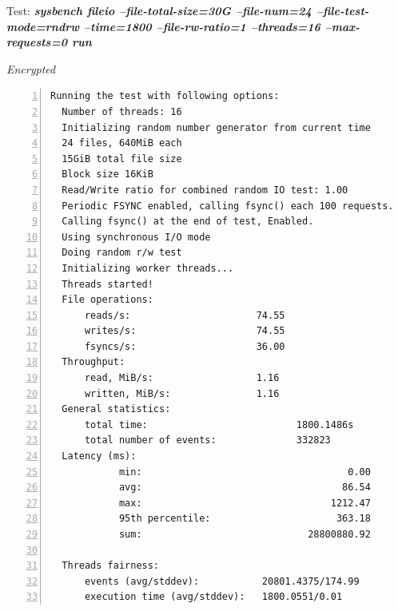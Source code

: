 \newpage
\begin{center}
  Test: \textbf{\textit{sysbench fileio --file-total-size=30G --file-num=24 --file-test-mode=rndrw --time=1800 --file-rw-ratio=1 --threads=16 --max-requests=0 run}}  
\end{center}
\vspace*{-\baselineskip}
\noindent\begin{minipage}[t]{0.45\linewidth}
  \centering
  \textit{Encrypted}
  \lstset{language=bash,label=SliceExaple}
  \begin{lstlisting}[basicstyle=\tiny,frame=single, numbers=left, label=cpu_test1]
  Running the test with following options:
  Number of threads: 16
  Initializing random number generator from current time
  24 files, 640MiB each
  15GiB total file size
  Block size 16KiB
  Read/Write ratio for combined random IO test: 1.00
  Periodic FSYNC enabled, calling fsync() each 100 requests.
  Calling fsync() at the end of test, Enabled.
  Using synchronous I/O mode
  Doing random r/w test
  Initializing worker threads...
  Threads started!
  File operations:
      reads/s:                      74.55
      writes/s:                     74.55
      fsyncs/s:                     36.00
  Throughput:
      read, MiB/s:                  1.16
      written, MiB/s:               1.16
  General statistics:
      total time:                          1800.1486s
      total number of events:              332823
  Latency (ms):
            min:                                    0.00
            avg:                                   86.54
            max:                                 1212.47
            95th percentile:                      363.18
            sum:                             28800880.92
  
  Threads fairness:
      events (avg/stddev):           20801.4375/174.99
      execution time (avg/stddev):   1800.0551/0.01
  \end{lstlisting}
\end{minipage}
\hspace{0.5cm}
